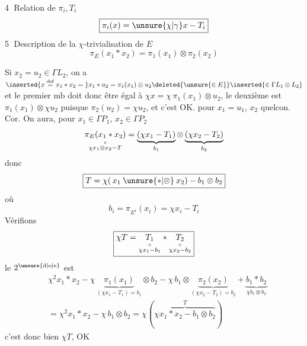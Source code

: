 \textcircled{4} Relation de $\pi_i,T_i$
\[
\boxed{\pi_i(x)=\unsure{\chi|\gamma}x-T_i}
\]
\textcircled{5} Description de la $\chi$-trivialisation de $E$
\[
\boxed{\pi_E(x_1*x_2)=\pi_1(x_1)\otimes\pi_2(x_2)}
\]

Si $x_2=u_2\in\Gamma L_2$, on a $\inserted{x\overset{\mathrm{def}}{=}x_1*x_2={}}x_1*u_2=\pi_1(x_1)\otimes u_2\deleted{\unsure{\in E}}\inserted{\in\Gamma L_1\otimes L_2}$ et  le premier mb doit donc être égal à $\chi x=\chi\,\pi_1(x_1)\otimes u_2$, le deuxième est $\pi_1(x_1)\otimes\chi u_2$ puisque $\pi_2(u_2)=\chi u_2$, et c'est OK.  pour $x_1=u_1$, $x_2$ quelcon.
Cor. On aura, pour $x_1\in\Gamma P_1$, $x_2\in\Gamma P_2$
\[
\underset{\substack{\shortparallel\\\chi x_1\otimes x_2-T}}{\pi_E(x_1*x_2)}
=\underbrace{(\chi x_1-T_1)}_{b_1}\otimes\underbrace{(\chi x_2-T_2)}_{b_2}
\]
donc
\[
\boxed{T=\chi(\,x_1\mathbin{\unsure{*|\otimes}}x_2)-b_1\otimes b_2}
\]
où
\[
b_i=\pi_{E^i}(x_i)=\chi x_i-T_i
\]
Vérifions
\[
\boxed{\chi T=\underset{\substack{\shortparallel\\\chi x_1-b_1}}{T_1}*
\underset{\substack{\shortparallel\\\chi x_2-b_2}}{T_2}}
\]
le $2^{\mathrm{\unsure{d|o|e}}}$  est
\[
\begin{aligned}
&\chi^2 x_1*x_2-\chi\,\underbrace{\pi_1(x_1)}_{(\chi x_1-T_1)=b_1}\otimes b_2
-\chi\,b_1\otimes\underbrace{\pi_2(x_2)}_{(\chi x_2-T_2)=b_2}
+\underbrace{b_1*b_2}_{\chi b_1\otimes b_2}\\
&=\chi^2 x_1*x_2-\chi\,b_1\otimes b_2=\chi(\overbrace{\chi x_1*x_2-b_1\otimes b_2}^{T})
\end{aligned}
\]
c'est donc bien  $\chi T$, OK
